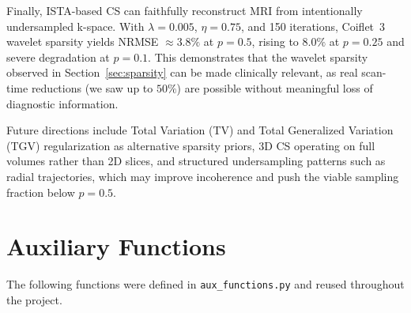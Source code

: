 \documentclass[10pt]{article}
\begin{document}
Finally, ISTA-based CS can faithfully reconstruct MRI from intentionally
undersampled k-space.  With $\lambda=0.005$, $\eta=0.75$, and 150
iterations, Coiflet~3 wavelet sparsity yields NRMSE $\approx 3.8\%$ at
$p=0.5$, rising to $8.0\%$ at $p=0.25$ and severe degradation at
$p=0.1$.  This
demonstrates that the wavelet sparsity observed in Section~\ref{sec:sparsity} can be made clinically relevant, as real scan-time reductions (we saw up to $50\%$) are possible without
meaningful loss of diagnostic information.


Future directions include Total Variation (TV) and Total Generalized
Variation (TGV) regularization as alternative sparsity priors, 3D CS
operating on full volumes rather than 2D slices, and structured
undersampling patterns such as radial trajectories, which may improve incoherence and push the viable sampling fraction below $p=0.5$.

\printbibliography

\appendix
{}

\section{Auxiliary Functions}
\label{app:aux}

The following functions were defined in \texttt{aux\_functions.py} and reused
throughout the project.
\end{document}
